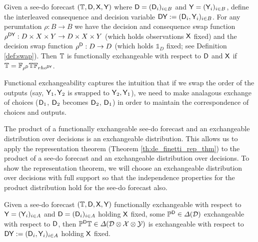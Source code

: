 \begin{definition}
Given a see-do forecast $(\mathbb{T},\mathsf{D},\mathsf{X},\mathsf{Y})$ where $\mathsf{D}=(\mathsf{D}_i)_{i\in B}$ and $\mathsf{Y}=(\mathsf{Y}_i)_{i\in B}$, define the interleaved consequence and decision variable $\mathsf{DY}:=(\mathsf{D}_i,\mathsf{Y}_i)_{i\in B}$. For any perumtation $\rho:B\to B$ we have the decision and consequence swap function $\rho^{\mathsf{DY}}:D\times X\times Y\to D\times X\times Y$ (which holds observations $\mathsf{X}$ fixed) and the decision swap function $\rho^{\mathsf{D}}:D\to D$ (which holds $\mathds{1}_D$ fixed; see Definition \ref{def:swap}). Then $\mathbb{T}$ is functionally exchangeable with respect to $\mathsf{D}$ and $\mathsf{X}$ if $\mathbb{T}=\mathbb{F}_{\rho^{\mathsf{D}}}\mathbb{T}\mathbb{F}_{rho^{\mathsf{D}\mathsf{Y}}}$.
\end{definition}

Functional exchangeability captures the intuition that if we swap the order of the outputs (say, $\mathsf{Y}_1,\mathsf{Y}_2$ is swapped to $\mathsf{Y}_2, \mathsf{Y}_1$), we need to make analagous exchange of choices ($\mathsf{D}_1$, $\mathsf{D}_2$ becomes $\mathsf{D}_2$, $\mathsf{D}_1$) in order to maintain the correspondence of choices and outputs.

The product of a functionally exchangeable see-do forecast and an exchangeable distribution over decisions is an exchangeable distribution. This allows us to apply the representation theorem (Theorem \ref{th:de_finetti_rep_thm}) to the product of a see-do forecast and an exchangeable distribution over decisions. To show the representation theorem, we will choose an exchangeable distribution over decisions with full support so that the independence properties for the product distribution hold for the see-do forecast also. 

\begin{lemma}\label{lem:f-ex2ex}
Given a see-do forecast $(\mathbb{T},\mathsf{D},\mathsf{X},\mathsf{Y})$ functionally exchangeable with respect to $\mathsf{Y}=(\mathsf{Y}_i)_{i\in A}$ and $\mathsf{D}=(\mathsf{D}_i)_{i\in A}$ holding $\mathsf{X}$ fixed, some $\mathbb{P}^{\mathsf{D}}\in \Delta(\mathcal{D})$ exchangeable with respect to $\mathsf{D}$, then $\mathbb{P}^{\mathsf{D}}\mathbb{T}\in \Delta(\mathcal{D}\otimes\mathcal{X}\otimes\mathcal{Y})$ is exchangeable with respect to $\mathsf{DY}:=(\mathsf{D}_i,\mathsf{Y}_i)_{i\in A}$ holding $\mathsf{X}$ fixed.
\end{lemma}

